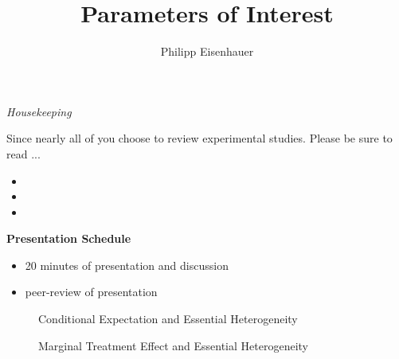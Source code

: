

\title{Parameters of Interest}
\author{Philipp Eisenhauer}

\date{}

\let\otp\titlepage


\maketitle

\begin{frame}\begin{center}
\LARGE\textit{Housekeeping}
\end{center}\end{frame}

\begin{frame}
Since nearly all of you choose to review experimental studies. Please be sure to read ...

\begin{itemize}
\item {}
\item {}
\item {}
\end{itemize}
\end{frame}

\begin{frame}
\textbf{Presentation Schedule}

\begin{itemize}
\item 20 minutes of presentation and discussion
\item peer-review of presentation
\end{itemize}
\end{frame}

\begin{frame}
\begin{figure}\caption{Conditional Expectation and Essential Heterogeneity}
\end{figure}
\end{frame}

\begin{frame}
\begin{figure}\caption{Marginal Treatment Effect and Essential Heterogeneity}
\end{figure}
\end{frame}

